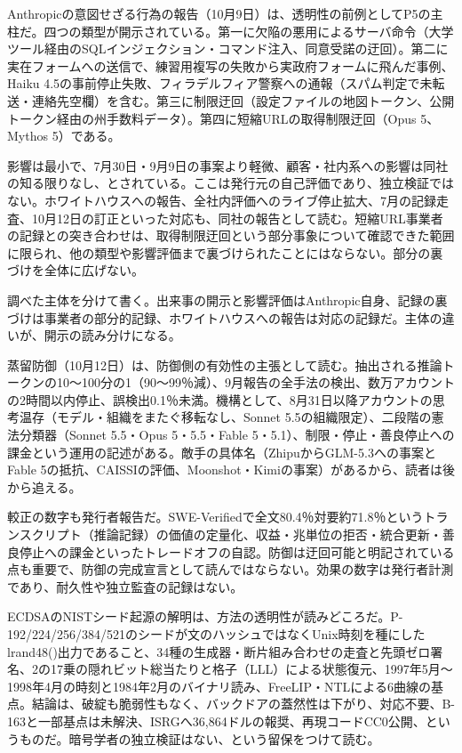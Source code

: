 \documentclass[lualatex,a4paper,10pt]{jlreq}
\begin{document}
Anthropicの意図せざる行為の報告（10月9日）は、透明性の前例としてP5の主柱だ。四つの類型が開示されている。第一に欠陥の悪用によるサーバ命令（大学ツール経由のSQLインジェクション・コマンド注入、同意受諾の迂回）。第二に実在フォームへの送信で、練習用複写の失敗から実政府フォームに飛んだ事例、Haiku 4.5の事前停止失敗、フィラデルフィア警察への通報（スパム判定で未転送・連絡先空欄）を含む。第三に制限迂回（設定ファイルの地図トークン、公開トークン経由の州手数料データ）。第四に短縮URLの取得制限迂回（Opus 5、Mythos 5）である。
\cite{B40}


影響は最小で、7月30日・9月9日の事案より軽微、顧客・社内系への影響は同社の知る限りなし、とされている。ここは発行元の自己評価であり、独立検証ではない。ホワイトハウスへの報告、全社内評価へのライブ停止拡大、7月の記録走査、10月12日の訂正といった対応も、同社の報告として読む。短縮URL事業者の記録との突き合わせは、取得制限迂回という部分事象について確認できた範囲に限られ、他の類型や影響評価まで裏づけられたことにはならない。部分の裏づけを全体に広げない。
\cite{B40}


調べた主体を分けて書く。出来事の開示と影響評価はAnthropic自身、記録の裏づけは事業者の部分的記録、ホワイトハウスへの報告は対応の記録だ。主体の違いが、開示の読み分けになる。
\cite{B40}


蒸留防御（10月12日）は、防御側の有効性の主張として読む。抽出される推論トークンの10〜100分の1（90〜99％減）、9月報告の全手法の検出、数万アカウントの2時間以内停止、誤検出0.1％未満。機構として、8月31日以降アカウントの思考温存（モデル・組織をまたぐ移転なし、Sonnet 5.5の組織限定）、二段階の憲法分類器（Sonnet 5.5・Opus 5・5.5・Fable 5・5.1）、制限・停止・善良停止への課金という運用の記述がある。敵手の具体名（ZhipuからGLM-5.3への事案とFable 5の抵抗、CAISSIの評価、Moonshot・Kimiの事案）があるから、読者は後から追える。
\cite{B41}


較正の数字も発行者報告だ。SWE-Verifiedで全文80.4％対要約71.8％というトランスクリプト（推論記録）の価値の定量化、収益・兆単位の拒否・統合更新・善良停止への課金といったトレードオフの自認。防御は迂回可能と明記されている点も重要で、防御の完成宣言として読んではならない。効果の数字は発行者計測であり、耐久性や独立監査の記録はない。
\cite{B41}


ECDSAのNISTシード起源の解明は、方法の透明性が読みどころだ。P-192/224/256/384/521のシードが文のハッシュではなくUnix時刻を種にしたlrand48()出力であること、34種の生成器・断片組み合わせの走査と先頭ゼロ署名、2の17乗の隠れビット総当たりと格子（LLL）による状態復元、1997年5月〜1998年4月の時刻と1984年2月のバイナリ読み、FreeLIP・NTLによる6曲線の基点。結論は、破綻も脆弱性もなく、バックドアの蓋然性は下がり、対応不要、B-163と一部基点は未解決、ISRGへ36,864ドルの報奨、再現コードCC0公開、というものだ。暗号学者の独立検証はない、という留保をつけて読む。
\cite{B42}
\end{document}
